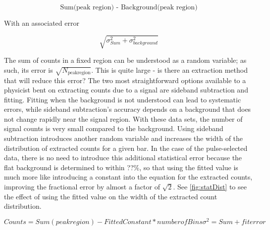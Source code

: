 \begin{equation}
\text{Sum(peak region) - Background(peak region)}
\label{eq:counts}
\end{equation}

With an associated error

\begin{equation}
\sqrt{\sigma_{Sum}^2 + \sigma_{background}^2}
\label{eq:errDef}
\end{equation}

The sum of counts in a fixed region can be understood as a random variable; as such, its error is $\sqrt{N_{\text{peakregion}}}$.  This is quite large - is there an extraction method that will reduce this error?  The two most straightforward options available to a physicist bent on extracting counts due to a signal are sideband subtraction and fitting.  Fitting when the background is not understood can lead to systematic errors, while sideband subtraction's accuracy depends on a background that does not change rapidly near the signal region.  With these data sets, the number of signal counts is very small compared to the background.  Using sideband subtraction introduces another random variable and increases the width of the distribution of extracted counts for a given bar.  In the case of the pulse-selected data, there is no need to introduce this additional statistical error because the flat background is determined to within ??\%, so that using the fitted value is much more like introducing a constant into the equation for the extracted counts, improving the fractional error by almost a factor of $\sqrt{2}$.  See \fig \ref{fig:statDist} to see the effect of using the fitted value on the width of the extracted count distribution.

\begin{equation}
Counts = Sum(peak region) - Fitted Constant * number of Bins
\sigma^2 = Sum + fit error
\label{eq:fitErr}
\end{equation}

